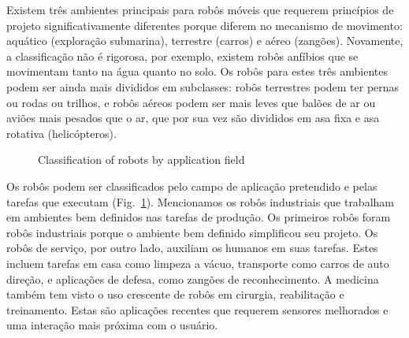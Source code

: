 Existem três ambientes principais para robôs móveis que requerem princípios de projeto significativamente diferentes porque diferem no mecanismo de movimento: aquático (exploração submarina), terrestre (carros) e aéreo (zangões). Novamente, a classificação não é rigorosa, por exemplo, existem robôs anfíbios que se movimentam tanto na água quanto no solo. Os robôs para estes três ambientes podem ser ainda mais divididos em subclasses: robôs terrestres podem ter pernas ou rodas ou trilhos, e robôs aéreos podem ser mais leves que balões de ar ou aviões mais pesados que o ar, que por sua vez são divididos em asa fixa e asa rotativa (helicópteros).

\begin{figure}
\begin{center}
\end{center}
\caption{Classification of robots by application field}\label{fig.classification2}
\end{figure}

Os robôs podem ser classificados pelo campo de aplicação pretendido e pelas tarefas que executam (Fig.~\ref{fig.classification2}). Mencionamos os robôs industriais que trabalham em ambientes bem definidos nas tarefas de produção. Os primeiros robôs foram robôs industriais porque o ambiente bem definido simplificou seu projeto.  Os robôs de serviço, por outro lado, auxiliam os humanos em suas tarefas. Estes incluem tarefas em casa como limpeza a vácuo, transporte como carros de auto direção, e aplicações de defesa, como zangões de reconhecimento. A medicina também tem visto o uso crescente de robôs em cirurgia, reabilitação e treinamento. Estas são aplicações recentes que requerem sensores melhorados e uma interação mais próxima com o usuário.

